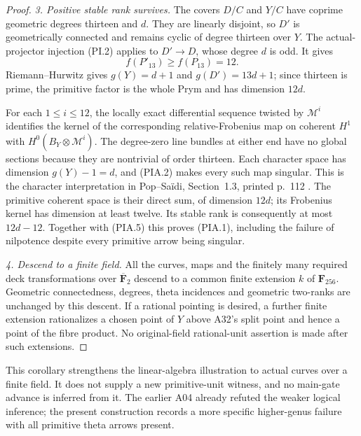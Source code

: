 \begin{proof}
\emph{3. Positive stable rank survives.}
The covers $D/C$ and $Y/C$ have coprime geometric degrees
thirteen and $d$. They are linearly disjoint, so $D'$ is
geometrically connected and remains cyclic of degree thirteen
over $Y$. The actual-projector injection (PI.2) applies to
$D'\to D$, whose degree $d$ is odd. It gives
\[
                            f(P'_{13})\ge f(P_{13})=12.
 \tag{PIA.5}
\]
Riemann--Hurwitz gives $g(Y)=d+1$ and $g(D')=13d+1$;
since thirteen is prime, the primitive factor is the whole
Prym and has dimension $12d$.

For each $1\le i\le12$, the locally exact differential
sequence twisted by $\mathcal M^i$ identifies the kernel of
the corresponding relative-Frobenius map on coherent $H^1$
with $H^0(B_Y\otimes\mathcal M^i)$. The degree-zero line
bundles at either end have no global sections because they
are nontrivial of order thirteen. Each character space has
dimension $g(Y)-1=d$, and (PIA.2) makes every such map
singular. This is the character interpretation in
Pop--Sa\"idi, Section~1.3, printed p.~112 \cite{PopSaidi}.
The primitive coherent space is their direct sum, of dimension
$12d$; its Frobenius kernel has dimension at least twelve.
Its stable rank is consequently at most $12d-12$.
Together with (PIA.5) this proves (PIA.1), including the
failure of nilpotence despite every primitive arrow being
singular.

\emph{4. Descend to a finite field.}
All the curves, maps and the finitely many required deck
transformations over $\overline{\mathbf F}_2$ descend to
a common finite extension $k$ of $\mathbf F_{256}$.
Geometric connectedness, degrees, theta incidences and
geometric two-ranks are unchanged by this descent.
If a rational pointing is desired, a further finite extension
rationalizes a chosen point of $Y$ above A32's split point
and hence a point of the fibre product. No original-field
rational-unit assertion is made after such extensions.
\end{proof}

This corollary strengthens the linear-algebra illustration to
actual curves over a finite field. It does not supply a new
primitive-unit witness, and no main-gate advance is inferred
from it. The earlier A04 already refuted the weaker logical
inference; the present construction records a more specific
higher-genus failure with all primitive theta arrows present.
